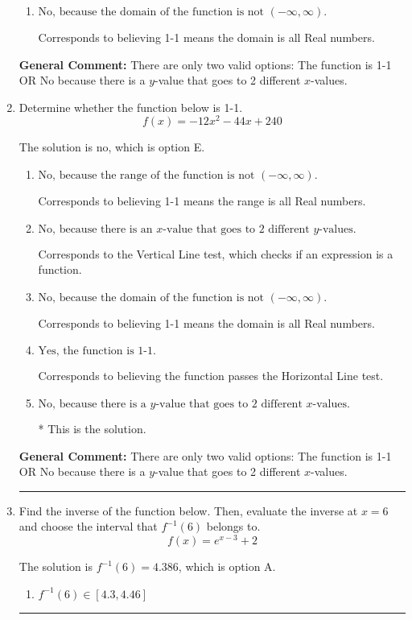 \documentclass{extbook}[14pt]
\newcommand{\litem}[1]{\item #1

\rule{\textwidth}{0.4pt}}
\begin{document}
\begin{enumerate}
{\begin{enumerate}[label=\Alph*.]
Corresponds to believing 1-1 means the range is all Real numbers.
\item \( \text{No, because the domain of the function is not $(-\infty, \infty)$.} \)

Corresponds to believing 1-1 means the domain is all Real numbers.
\end{enumerate}

\textbf{General Comment:} There are only two valid options: The function is 1-1 OR No because there is a $y$-value that goes to 2 different $x$-values.
}
\litem{
Determine whether the function below is 1-1.
\[ f(x) = -12 x^2 - 44 x + 240 \]

The solution is \( \text{no} \), which is option E.\begin{enumerate}[label=\Alph*.]
\item \( \text{No, because the range of the function is not $(-\infty, \infty)$.} \)

Corresponds to believing 1-1 means the range is all Real numbers.
\item \( \text{No, because there is an $x$-value that goes to 2 different $y$-values.} \)

Corresponds to the Vertical Line test, which checks if an expression is a function.
\item \( \text{No, because the domain of the function is not $(-\infty, \infty)$.} \)

Corresponds to believing 1-1 means the domain is all Real numbers.
\item \( \text{Yes, the function is 1-1.} \)

Corresponds to believing the function passes the Horizontal Line test.
\item \( \text{No, because there is a $y$-value that goes to 2 different $x$-values.} \)

* This is the solution.
\end{enumerate}

\textbf{General Comment:} There are only two valid options: The function is 1-1 OR No because there is a $y$-value that goes to 2 different $x$-values.
}
\litem{
Find the inverse of the function below. Then, evaluate the inverse at $x = 6$ and choose the interval that $f^{-1}(6)$ belongs to.
\[ f(x) = e^{x-3}+2 \]

The solution is \( f^{-1}(6) = 4.386 \), which is option A.\begin{enumerate}[label=\Alph*.]
\item \( f^{-1}(6) \in [4.3, 4.46] \)


\end{enumerate}}
\end{enumerate}
\end{document}

